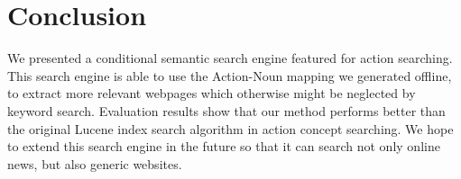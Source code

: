 \section{Conclusion}
We presented a conditional semantic search engine
featured for action searching. This search engine
is able to use the Action-Noun mapping we generated
offline, to extract more relevant webpages which 
otherwise might be neglected by keyword search. 
Evaluation results show that our method performs
better than the original Lucene index search
algorithm in action concept searching. We hope to 
extend this search engine in the future
so that it can search not only online news,
but also generic websites.
